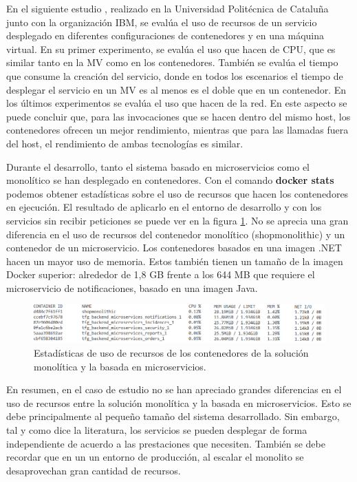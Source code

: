 \documentclass[11pt,spanish,listoffigures]{tfgetsinf}
\begin{document}
En el siguiente estudio \cite{Amaral2016}, realizado en la Universidad Politécnica de Cataluña junto con la organización IBM, se evalúa el uso de recursos de un servicio desplegado en diferentes configuraciones de contenedores y en una máquina virtual. En su primer experimento, se evalúa el uso que hacen de CPU, que es similar tanto en la MV como en los contenedores. También se evalúa el tiempo que consume la creación del servicio, donde en todos los escenarios el tiempo de desplegar el servicio en un MV es al menos es el doble que en un contenedor. En los últimos experimentos se evalúa el uso que hacen de la red. En este aspecto se puede concluir que, para las invocaciones que se hacen dentro del mismo host, los contenedores ofrecen un mejor rendimiento, mientras que para las llamadas fuera del host, el rendimiento de ambas tecnologías es similar.

Durante el desarrollo, tanto el sistema basado en microservicios como el monolítico se han desplegado en contenedores. Con el comando \textbf{docker stats} podemos obtener estadísticas sobre el uso de recursos que hacen los contenedores en ejecución. El resultado de aplicarlo en el entorno de desarrollo y con los servicios sin recibir peticiones se puede ver en la figura \ref{fig:UsoRecursos}. No se aprecia una gran diferencia en el uso de recursos del contenedor monolítico (shopmonolithic) y un contenedor de un microservicio. Los contenedores basados en una imagen .NET hacen un mayor uso de memoria. Estos también tienen un tamaño de la imagen Docker superior: alrededor de 1,8 GB frente a los 644 MB que requiere el microservicio de notificaciones, basado en una imagen Java.

\begin{figure}[h]
\centering
\includegraphics[scale=0.65]{useMemory}
\caption{Estadísticas de uso de recursos de los contenedores de la solución monolítica y la basada en microservicios.}
\label{fig:UsoRecursos}
\end{figure}

En resumen, en el caso de estudio no se han apreciado grandes diferencias en el uso de recursos entre la solución monolítica y la basada en microservicios. Esto se debe principalmente al pequeño tamaño del sistema desarrollado. Sin embargo, tal y como dice la literatura, los servicios se pueden desplegar de forma independiente de acuerdo a las prestaciones que necesiten. También se debe recordar que en un un entorno de producción, al escalar el monolito se desaprovechan gran cantidad de recursos.
\end{document}
